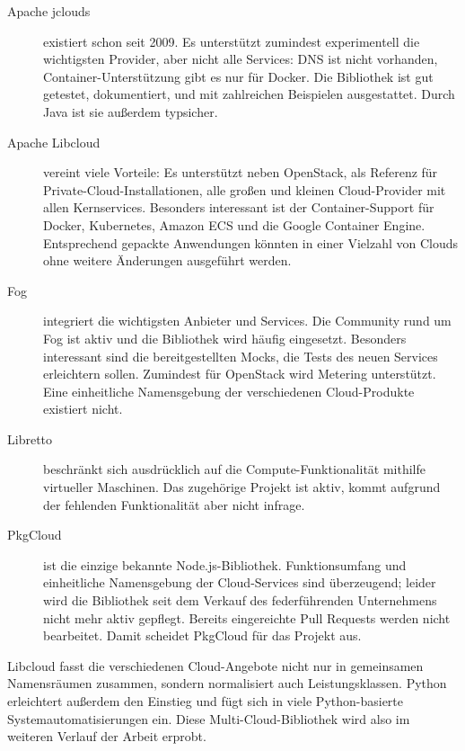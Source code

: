 \begin{description}
	
	\item[Apache jclouds] existiert schon seit 2009. Es unterstützt zumindest experimentell die wichtigsten Provider, aber nicht alle Services: DNS ist nicht vorhanden, Container-Unterstützung gibt es nur für Docker. Die Bibliothek ist gut getestet, dokumentiert, und mit zahlreichen Beispielen ausgestattet. Durch Java ist sie außerdem typsicher.

	\item[Apache Libcloud] vereint viele Vorteile: Es unterstützt neben OpenStack, als Referenz für Private-Cloud-Installationen, alle großen und kleinen Cloud-Provider mit allen Kernservices. Besonders interessant ist der Container-Support für Docker, Kubernetes, Amazon ECS und die Google Container Engine. Entsprechend gepackte Anwendungen könnten in einer Vielzahl von Clouds ohne weitere Änderungen ausgeführt werden.

	\item[Fog] integriert die wichtigsten Anbieter und Services. Die Community rund um Fog ist aktiv und die Bibliothek wird häufig eingesetzt. Besonders interessant sind die bereitgestellten Mocks, die Tests des neuen Services erleichtern sollen. Zumindest für OpenStack wird Metering unterstützt. Eine einheitliche Namensgebung der verschiedenen Cloud-Produkte existiert nicht.

	\item[Libretto] beschränkt sich ausdrücklich auf die Compute-Funktionalität mithilfe virtueller Maschinen. Das zugehörige Projekt ist aktiv, kommt aufgrund der fehlenden Funktionalität aber nicht infrage.

	\item[PkgCloud] ist die einzige bekannte Node.js-Bibliothek. Funktionsumfang und einheitliche Namensgebung der Cloud-Services sind überzeugend; leider wird die Bibliothek seit dem Verkauf des federführenden Unternehmens nicht mehr aktiv gepflegt. Bereits eingereichte Pull Requests werden nicht bearbeitet. Damit scheidet PkgCloud für das Projekt aus.

\end{description}

\noindent Libcloud fasst die verschiedenen Cloud-Angebote nicht nur in gemeinsamen Namensräumen zusammen, sondern normalisiert auch Leistungsklassen. Python erleichtert außerdem den Einstieg und fügt sich in viele Python-basierte Systemautomatisierungen ein. Diese Multi-Cloud-Bibliothek wird also im weiteren Verlauf der Arbeit erprobt.


